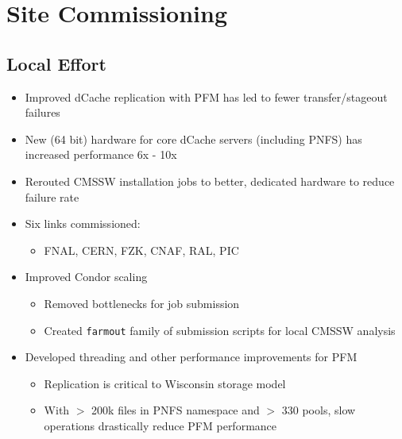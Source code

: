 \documentclass{beamer}
\begin{document}
\section{Site Commissioning}
\subsection{Local Effort}
\begin{frame}
\begin{itemize}
    \item Improved dCache replication with PFM has led to fewer transfer/stageout failures
    \item New (64 bit) hardware for core dCache servers (including PNFS) has increased performance 6x - 10x
    \item Rerouted CMSSW installation jobs to better, dedicated hardware to reduce failure rate
    \item Six links commissioned:
    \begin{itemize}
        \item FNAL, CERN, FZK, CNAF, RAL, PIC
    \end{itemize}
    \item Improved Condor scaling
    \begin{itemize}
        \item Removed bottlenecks for job submission
        \item Created {\tt farmout} family of submission scripts for local CMSSW analysis
    \end{itemize}
    \item Developed threading and other performance improvements for PFM
    \begin{itemize}
        \item Replication is critical to Wisconsin storage model
        \item With $>$ 200k files in PNFS namespace and $>$ 330 pools, slow operations drastically reduce PFM performance
    \end{itemize}
\end{itemize}
\end{frame}
\end{document}
